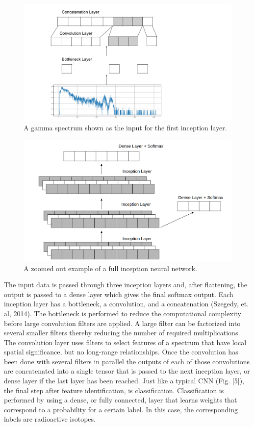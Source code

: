 \documentclass[11pt]{article}
\begin{document}
\begin{figure}[h]
    \centering
    \includegraphics[width=\textwidth]{inn-layer_figure.png}
    \caption{A gamma spectrum shown as the input for the first inception layer.}
    \label{fig:inn-layer}
\end{figure}
\begin{figure}[h]
    \centering
    \includegraphics[width=\textwidth]{inn-full-figure.png}
    \caption{A zoomed out example of a full inception neural network.}
    \label{fig:inn-full}
\end{figure}

The input data is passed through three inception layers and, after flattening, the output is passed to a dense layer which gives the final softmax output. 
Each inception layer has a bottleneck, a convolution, and a concatenation (Szegedy, et. al, 2014).
The bottleneck is performed to reduce the computational complexity before large convolution filters are applied. 
A large filter can be factorized into several smaller filters thereby reducing the number of required multiplications. 
The convolution layer uses filters to select features of a spectrum that have local spatial significance, but no long-range relationships. 
Once the convolution has been done with several filters in parallel the outputs of each of those convolutions are concatenated into a single tensor that is passed to the next inception layer, or dense layer if the last layer has been reached. 
Just like a typical CNN (Fig. [5]), the final step after feature identification, is classification. 
Classification is performed by using a dense, or fully connected, layer that learns weights that correspond to a probability for a certain label. 
In this case, the corresponding labels are radioactive isotopes.
\end{document}
